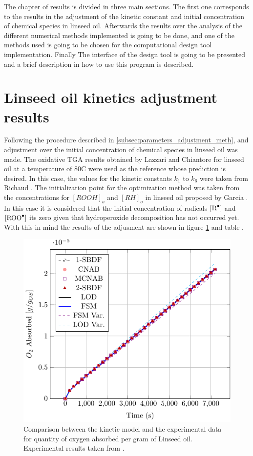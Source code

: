 \begin{refsection}
The chapter of results is divided in three main sections. The first one corresponds to the results in the adjustment of the kinetic constant and initial concentration of chemical species in linseed oil. Afterwards  the results over the analysis of the different numerical methods implemented is going to be done, and one of the methods used is going to be chosen for the computational design tool implementation. Finally The interface of the design tool is going to be presented and a brief description in how to use this program is described.  


\section{Linseed oil kinetics adjustment results}
Following the procedure described in \ref{subsec:parameters_adjustment_meth}, and adjustment over the initial concentration of chemical species in linseed oil was made.  The oxidative TGA results obtained by  Lazzari and Chiantore \cite{lazzari1999drying}  for linseed oil at a temperature of 80\degree C were used as the reference whose prediction is desired. In this case, the values for the kinetic constants $k_1$  to $k_6$  were taken from Richaud \cite{Richaud2012RateChemiluminescence}. The initialization point for the optimization method was taken from the concentrations for $[ROOH]_o$ and  $[RH]_o$  in linseed oil proposed by Garcia \cite{GarciaMora2015KineticScavengers}. In this case it is considered that the initial concentration of radicals $[\ce{R^.}]$ and $[\ce{ROO^.}]$ its zero given that hydroperoxide decomposition has not occurred yet. With this in mind the results of the adjusment are shown in figure \ref{fig:ajuste_1_cinetica} and table .

\begin{figure}[H]
    \centering
    \includegraphics[width=0.56\linewidth,page=4]{Documento_Latex/Imagenes/rozogafas.pdf}
    \caption{Comparison between the kinetic model and the experimental data for quantity of oxygen absorbed per gram of Linseed oil. Experimental results taken from \cite{lazzari1999drying}.}
    \label{fig:ajuste_1_cinetica}
\end{figure}


\end{refsection}
